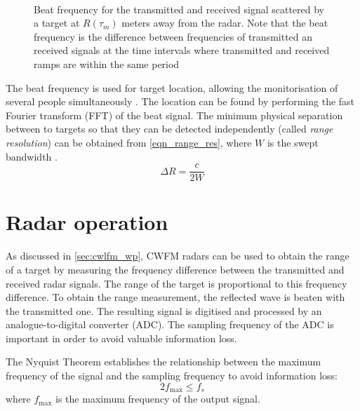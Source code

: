 \begin{figure}[ht]
	\centering
	\\
	\caption[Beat frequency for the transmitted and received signal scattered by a target at $R(\tau_m)$ meters away from the radar]{Beat frequency for the transmitted and received signal scattered by a target at $R(\tau_m)$ meters away from the radar. Note that the beat frequency is the difference between frequencies of transmitted an received signals at the time intervals where transmitted and received ramps are within the same period \cite{Sardinero2022} 		\label{fig_cwlfm_ramps}}
\end{figure}

The beat frequency is used for target location, allowing the monitorisation of several people simultaneously \cite{Antolinos2020}. The location can be found by performing the fast Fourier transform (FFT) of the beat signal. The minimum physical separation between to targets so that they can be detected independently (called \textit{range resolution}) can be obtained from \cref{eqn_range_res}, where $W$ is the swept bandwidth %
\cite{Sardinero2022}.
\begin{equation} \label{eqn:range_res}
	\Delta R = \frac{c}{2W} %
\end{equation}

\section{Radar operation} \label{sec:radar_op}

As discussed in \cref{sec:cwlfm_wp}, CWFM radars can be used to obtain the range of a target by measuring the frequency difference between the transmitted and received radar signals. The range of the target is proportional to this frequency difference. To obtain the range measurement, the reflected wave is beaten with the transmitted one. The resulting signal is digitised and processed by an analogue-to-digital converter (ADC). The sampling frequency of the ADC is important in order to avoid valuable information loss.

The Nyquist Theorem \cite{Shannon1949} establishes the relationship between the maximum frequency of the signal and the sampling frequency to avoid information loss:
\begin{equation} \label{eq:nyquist}
	2 f_{\max} \le f_s
\end{equation}
where $f_{\max}$ is the maximum frequency of the output signal.

